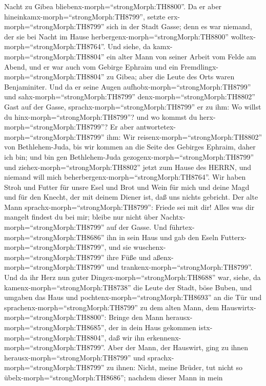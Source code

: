 Nacht zu Gibea bliebenx-morph=``strongMorph:TH8800''. Da er aber
hineinkamx-morph=``strongMorph:TH8799'', setzte
erx-morph=``strongMorph:TH8799'' sich in der Stadt Gasse; denn es war
niemand, der sie bei Nacht im Hause
herbergenx-morph=``strongMorph:TH8800''
wolltex-morph=``strongMorph:TH8764''.  Und siehe, da
kamx-morph=``strongMorph:TH8804'' ein alter Mann von seiner Arbeit vom
Felde am Abend, und er war auch vom Gebirge Ephraim und ein
Fremdlingx-morph=``strongMorph:TH8804'' zu Gibea; aber die Leute des
Orts waren Benjaminiter.  Und da er seine Augen
aufhobx-morph=``strongMorph:TH8799'' und
sahx-morph=``strongMorph:TH8799'' denx-morph=``strongMorph:TH8802'' Gast
auf der Gasse, sprachx-morph=``strongMorph:TH8799'' er zu ihm: Wo willst
du hinx-morph=``strongMorph:TH8799''? und wo kommst du
herx-morph=``strongMorph:TH8799''?  Er aber
antwortetex-morph=``strongMorph:TH8799'' ihm: Wir
reisenx-morph=``strongMorph:TH8802'' von Bethlehem-Juda, bis wir kommen
an die Seite des Gebirges Ephraim, daher ich bin; und bin gen
Bethlehem-Juda gezogenx-morph=``strongMorph:TH8799'' und
ziehex-morph=``strongMorph:TH8802'' jetzt zum Hause des HERRN, und
niemand will mich beherbergenx-morph=``strongMorph:TH8764''.
 Wir haben Stroh und Futter für unsre Esel und Brot und
Wein für mich und deine Magd und für den Knecht, der mit deinem Diener
ist, daß uns nichts gebricht.  Der alte Mann
sprachx-morph=``strongMorph:TH8799'': Friede sei mit dir! Alles was dir
mangelt findest du bei mir; bleibe nur nicht über
Nachtx-morph=``strongMorph:TH8799'' auf der Gasse.  Und
führtex-morph=``strongMorph:TH8686'' ihn in sein Haus und gab den Eseln
Futterx-morph=``strongMorph:TH8799'', und sie
wuschenx-morph=``strongMorph:TH8799'' ihre Füße und
aßenx-morph=``strongMorph:TH8799'' und
trankenx-morph=``strongMorph:TH8799''.  Und da ihr Herz nun
guter Dingex-morph=``strongMorph:TH8688'' war, siehe, da
kamenx-morph=``strongMorph:TH8738'' die Leute der Stadt, böse Buben, und
umgaben das Haus und pochtenx-morph=``strongMorph:TH8693'' an die Tür
und sprachenx-morph=``strongMorph:TH8799'' zu dem alten Mann, dem
Hauswirtx-morph=``strongMorph:TH8800'': Bringe den Mann
herausx-morph=``strongMorph:TH8685'', der in dein Haus gekommen
istx-morph=``strongMorph:TH8804'', daß wir ihn
erkennenx-morph=``strongMorph:TH8799''.  Aber der Mann, der
Hauswirt, ging zu ihnen herausx-morph=``strongMorph:TH8799'' und
sprachx-morph=``strongMorph:TH8799'' zu ihnen: Nicht, meine Brüder, tut
nicht so übelx-morph=``strongMorph:TH8686''; nachdem dieser Mann in mein
